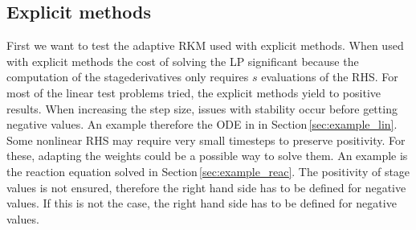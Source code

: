 \documentclass[a4paper]{article}
\numberwithin{equation}{section}
\theoremstyle{plain}
\theoremstyle{definition}
\numberwithin{theorem}{section}
\newcommand{\1}{\mathbbm{1}}
\begin{document}
\subsection{Explicit methods}\label{sec:Ex_expl}
First we want to test the adaptive RKM used with explicit methods.  
When used with explicit methods the cost of solving the LP significant because the computation of the stagederivatives only requires $s$ evaluations of the RHS. 
For most of the linear test problems tried, the explicit methods yield to positive results.  
When increasing the step size, issues with stability occur before getting negative values.  
An example therefore the ODE in in Section\,\ref{sec:example_lin}. 
Some nonlinear RHS may require very small timesteps to preserve positivity.  
For these, adapting the weights could be a possible way to solve them. 
An example is the reaction equation solved in Section\,\ref{sec:example_reac}. 
The positivity of stage values is not ensured, therefore the right hand side has to be defined for negative values. If this is not the case, the right hand side has to be defined for negative values. 
\end{document}
